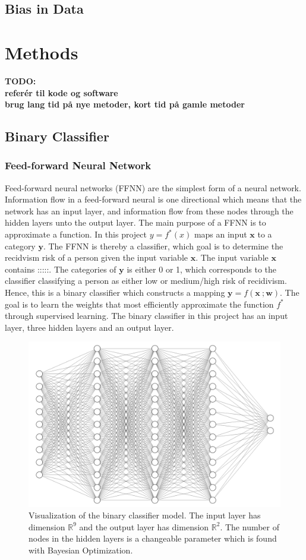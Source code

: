 \documentclass[11pt, fleqn, titlepage]{article}
\begin{document}
	\subsection{Bias in Data}
	
	
	\section{Methods}
	\textbf{TODO: \\ referér til kode og software \\ brug lang tid på nye metoder, kort tid på gamle metoder}
	
	\subsection{Binary Classifier}\label{Feed-forward neural}
	\subsubsection{Feed-forward Neural Network}
	Feed-forward neural networks (FFNN) are the simplest form of a neural network. Information flow in a feed-forward neural is one directional which means that the network has an input layer, and information flow from these nodes through the hidden layers unto the output layer. The main purpose of a FFNN is to approximate a function. In this project $ y = f^*(x) $ maps an input $ \mathbf x $ to a category $ \mathbf y $. The FFNN is thereby a classifier, which goal is to determine the recidvism risk of a person given the input variable $ \mathbf x $. The input variable $ \mathbf x $ contains :::::. The categories of $ \mathbf y $ is either 0 or 1, which corresponds to the classifier classifying a person as either low or medium/high risk of recidivism. Hence, this is a binary classifier which constructs a mapping $ \mathbf y = f(\mathbf x \ ; \mathbf w) $. The goal is to learn the weights that most efficiently approximate the function $ f^* $ through supervised learning. The binary classifier in this project has an input layer, three hidden layers and an output layer. 
	
	\begin{figure}[H]
		\centering
		\includegraphics[width=0.5\linewidth]{imgs/ffnn}
		\caption{Visualization of the binary classifier model. The input layer has dimension $ \mathbb R ^9$ and the output layer has dimension $ \mathbb R^2 $. The number of nodes in the hidden layers is a changeable parameter which is found with Bayesian Optimization. }
		\label{fig:ffnn}
	\end{figure}
	
\end{document}

